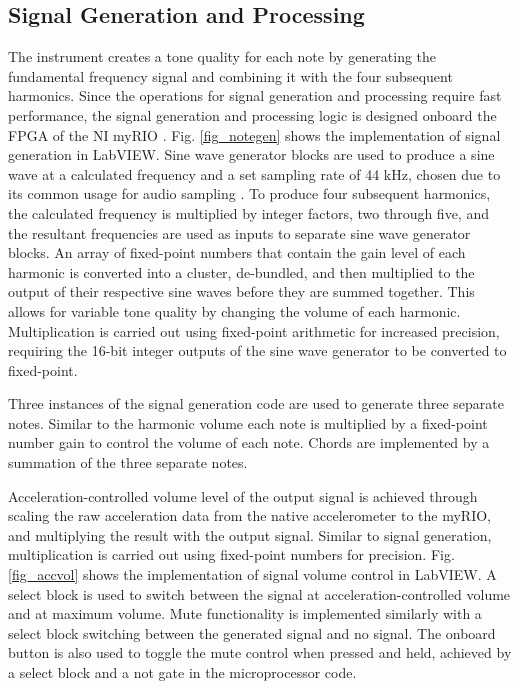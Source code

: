 \subsection{Signal Generation and Processing}
The instrument creates a tone quality for each note by generating the fundamental frequency signal and combining it with the four subsequent harmonics.
 Since the operations for signal generation and processing require fast performance, the signal generation and processing logic is designed onboard the FPGA of the NI myRIO \cite{rt_comparison}.
 Fig. \ref{fig_notegen} shows the implementation of signal generation in LabVIEW.
 Sine wave generator blocks are used to produce a sine wave at a calculated frequency and a set sampling rate of 44 kHz, chosen due to its common usage for audio sampling \cite{sampling_rate}.
 To produce four subsequent harmonics, the calculated frequency is multiplied by integer factors, two through five, and the resultant frequencies are used as inputs to separate sine wave generator blocks.
 An array of fixed-point numbers that contain the gain level of each harmonic is converted into a cluster, de-bundled, and then multiplied to the output of their respective sine waves before they are summed together.
 This allows for variable tone quality by changing the volume of each harmonic.
 Multiplication is carried out using fixed-point arithmetic for increased precision, requiring the 16-bit integer outputs of the sine wave generator to be converted to fixed-point.

Three instances of the signal generation code are used to generate three separate notes. 
Similar to the harmonic volume each note is multiplied by a fixed-point number gain to control the volume of each note. 
Chords are implemented by a summation of the three separate notes.

Acceleration-controlled volume level of the output signal is achieved through scaling the raw acceleration data from the native accelerometer to the myRIO, and multiplying the result with the output signal. 
Similar to signal generation, multiplication is carried out using fixed-point numbers for precision. 
 Fig. \ref{fig_accvol} shows the implementation of signal volume control in LabVIEW.
 A select block is used to switch between the signal at acceleration-controlled volume and at maximum volume.
 Mute functionality is implemented similarly with a select block switching between the generated signal and no signal.
 The onboard button is also used to toggle the mute control when pressed and held, achieved by a select block and a not gate in the microprocessor code.


